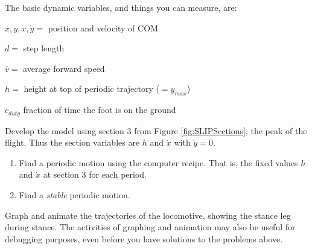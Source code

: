 The basic dynamic variables, and things you can measure, are:
\begin{description}
\item{$ x,y,\dot{x}, \dot{y}=$} position and velocity of COM
\item{$d=$} step length
\item{$ \bar{v} =$} average forward speed
\item{$h=$} height at top of periodic trajectory ($=y_{max}$)
\item{$c_{duty}$} fraction of time the foot is on the ground
\end{description}

Develop the model using section 3 from Figure \ref{fig:SLIPSections}, the peak of the flight.
Thus the section variables are $h$ and $\dot{x}$ with $\dot{y} = 0$.

\begin{enumerate}

\item Find a periodic motion using the computer recipe. That is, the fixed values $h$ and $\dot{x}$ at section 3 for each period.

\item Find a \textit{stable} periodic motion.

\end{enumerate}

Graph and animate the trajectories of the locomotive, showing the stance leg
during stance.  The activities of graphing and animation may also be useful for debugging purposes,
even before you have solutions to the problems above.

%
%

